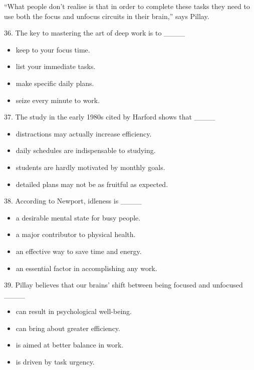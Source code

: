 \documentclass[UTF8,11pt]{ctexart}
\begin{document}
“What people don’t realise is that in order to complete these tasks they need to use both the focus and unfocus circuits in their brain,” says Pillay.


36. The key to mastering the art of deep work is to \_\_\_\_


\begin{itemize}[leftmargin=2em,itemsep=.2em,topsep=.4em]\item[A.] keep to your focus time.
\item[B.] list your immediate tasks.
\item[C.] make specific daily plans.
\item[D.] seize every minute to work.
\end{itemize}

37. The study in the early 1980s cited by Harford shows that \_\_\_\_


\begin{itemize}[leftmargin=2em,itemsep=.2em,topsep=.4em]\item[A.] distractions may actually increase efficiency.
\item[B.] daily schedules are indispensable to studying.
\item[C.] students are hardly motivated by monthly goals.
\item[D.] detailed plans may not be as fruitful as expected.
\end{itemize}

38. According to Newport, idleness is \_\_\_\_


\begin{itemize}[leftmargin=2em,itemsep=.2em,topsep=.4em]\item[A.] a desirable mental state for busy people.
\item[B.] a major contributor to physical health.
\item[C.] an effective way to save time and energy.
\item[D.] an essential factor in accomplishing any work.
\end{itemize}

39. Pillay believes that our brains’ shift between being focused and unfocused \_\_\_\_


\begin{itemize}[leftmargin=2em,itemsep=.2em,topsep=.4em]\item[A.] can result in psychological well-being.
\item[B.] can bring about greater efficiency.
\item[C.] is aimed at better balance in work.
\item[D.] is driven by task urgency.
\end{itemize}
\end{document}
